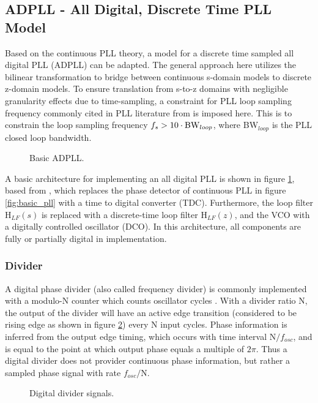 \subsection{ADPLL - All Digital, Discrete Time PLL Model}\label{adpll_model}
Based on the continuous PLL theory, a model for a discrete time sampled all digital PLL (ADPLL) can be adapted. The general approach here utilizes the bilinear transformation \cite{proakis_1993_bilinear} to bridge between continuous s-domain models to discrete z-domain models. To ensure translation from s-to-z domains with negligible granularity effects due to time-sampling, a constraint for PLL loop sampling frequency commonly cited in PLL literature from \cite{gardner_1980} is imposed here. This is to constrain the loop sampling frequency $f_s > 10\cdot\textnormal{BW}_{loop}$, where BW$_{loop}$ is the PLL closed loop bandwidth.
\begin{figure}[htb!]
	\center
	\caption{Basic ADPLL.}
	\label{fig:basic_adpll}
\end{figure}
\FloatBarrier
A basic architecture for implementing an all digital PLL is shown in figure \ref{fig:basic_adpll}, based from \cite{hsu_straayer_perrott_2008}\cite{temporiti_2009}, which replaces the phase detector of continuous PLL in figure \ref{fig:basic_pll} with a time to digital converter (TDC). Furthermore, the loop filter $\mathrm{H}_{LF}(s)$ is replaced with a discrete-time loop filter $\mathrm{H}_{LF}(z)$, and the VCO with a digitally controlled oscillator (DCO). In this architecture, all components are fully or partially digital in implementation. 

\subsubsection{Divider}\label{div_theory}
	A digital phase divider (also called frequency divider) is commonly implemented with a modulo-N counter which counts oscillator cycles \cite{weste_harris_2011}. With a divider ratio N, the output of the divider will have an active edge transition (considered to be rising edge as shown in figure \ref{fig:digital_div}) every N input cycles. Phase information is inferred from the output edge timing, which occurs with time interval N$/f_{osc}$, and is equal to the point at which output phase equals a multiple of $2\pi$. Thus a digital divider does not provider continuous phase information, but rather a sampled phase signal with rate $f_{osc}/$N. 
	\begin{figure}[htb!]
		\center
		\caption{Digital divider signals.}
		\label{fig:digital_div}
	\end{figure}

